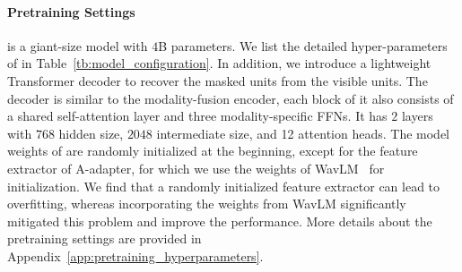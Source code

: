 
\paragraph{Pretraining Settings}


\onepeace is a giant-size model with $4$B parameters. We list the detailed hyper-parameters of \onepeace in Table~\ref{tb:model_configuration}. 
In addition, we introduce a lightweight Transformer decoder to recover the masked units from the visible units. The decoder is similar to the modality-fusion encoder, each block of it also consists of a shared self-attention layer and three modality-specific FFNs.
It has $2$ layers with $768$ hidden size, $2048$ intermediate size, and 12 attention heads.
The model weights of \onepeace are randomly initialized at the beginning, except for the feature extractor of A-adapter, for which we use the weights of WavLM~\cite{wavlm} for initialization. We find that a randomly initialized feature extractor can lead to overfitting, whereas incorporating the weights from WavLM significantly mitigated this problem and improve the performance.
More details about the pretraining settings are provided in Appendix~\ref{app:pretraining_hyperparameters}.


